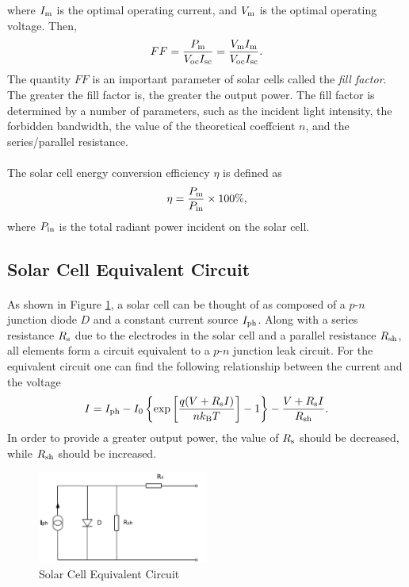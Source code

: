 \documentclass[a4paper]{article}
\begin{document}
    where $I_{\rm m}$ is the optimal operating current, and $V_{\rm m}$ is the optimal operating voltage. Then, $$FF=\frac{P_{\rm m}}{V_{\rm oc}I_{\rm sc}}=\frac{V_{\rm m}I_{\rm m}}{V_{\rm oc}I_{\rm sc}}.$$ The quantity $FF$ is an important parameter of solar cells called the \emph{fill factor}. The greater the fill factor is, the greater the output power. The fill factor is determined by a number of parameters, such as the incident light intensity, the forbidden bandwidth, the value of the theoretical coeffcient $n$, and the series/parallel resistance.
    \vspace{-5mm}
    \paragraph{}The solar cell energy conversion efficiency $\eta$ is defined as $$\eta=\frac{P_{\rm m}}{P_{\rm in}}\times 100\%,$$ where $P_{\rm in}$ is the total radiant power incident on the solar cell.
    \subsection{Solar Cell Equivalent Circuit}
    \paragraph{}As shown in Figure \ref{fig:equivalentCircuit}, a solar cell can be thought of as composed of a $p$-$n$ junction diode $D$ and a constant current source $I_{\rm ph}$. Along with a series resistance $R_{\rm s}$ due to the electrodes in the solar cell and a parallel resistance $R_{\rm sh}$, all elements form a circuit equivalent to a $p$-$n$ junction leak circuit. For the equivalent circuit one can find the following relationship between the current and the voltage $$I=I_{\rm ph}-I_0\left\{\exp\left[\frac{q(V+R_{\rm s}I)}{nk_{\rm B}T}\right]-1\right\}-\frac{V+R_{\rm s}I}{R_{\rm sh}}.$$ In order to provide a greater output power, the value of $R_{\rm s}$ should be decreased, while $R_{\rm sh}$ should be increased. 
    \begin{figure}[!ht]
        \centering
        \includegraphics[width=0.5\textwidth]{fig/equivalentCircuit.png}
        \caption{Solar Cell Equivalent Circuit}
        \label{fig:equivalentCircuit}
    \end{figure}
\end{document}
